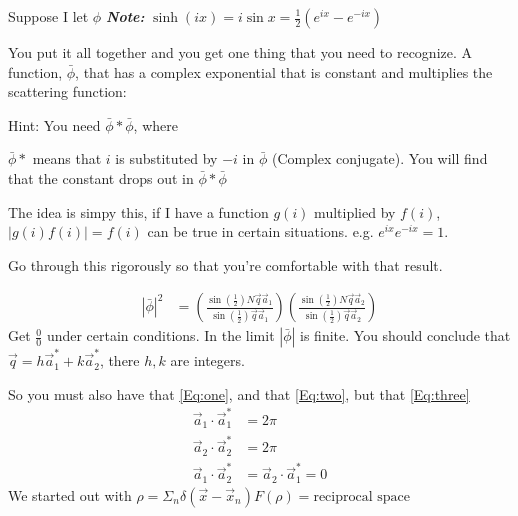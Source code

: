 \documentclass{article}
\newcommand{\qvec}[0]{\vec{q}}
\newcommand{\xvec}[0]{\vec{x}}
\newcommand{\aone}[0]{\vec{a}_1}
\newcommand{\atwo}[0]{\vec{a}_2}
\newcommand{\note}[1]{\vspace{3\parsep}\textit{\textbf{Note: }}#1\vspace{2\parsep}}
\newcommand{\norm}[1]{\left|#1\right|}
\begin{document}
\begin{section}{Suppose I let $\phi$}
	\note{$\sinh{(ix)}=i\sin{x}=\frac{1}{2}(e^{ix}-e^{-ix})$}

	You put it all together and you get one thing that you need to recognize. A function, $\bar{\phi}$, that has a complex exponential that is constant and multiplies the scattering function:

	Hint: You need $\bar{\phi}\ast\bar{\phi}$, where
	
	$\bar{\phi}\ast$ means that $i$ is substituted by $-i$ in $\bar{\phi}$ (Complex conjugate).
	You will find that the constant drops out in $\bar{\phi}\ast\bar{\phi}$ 
	
	The idea is simpy this, if I have a function $g(i)$ multiplied by $f(i)$, $\norm{g(i)f(i)} = f(i)$ can be true in certain situations. e.g. $e^{ix}e^{-ix}=1$.

	Go through this rigorously so that you're comfortable with that result.

	\begin{align*}
		\norm{\bar{\phi}}^2 &= \left(\frac{\sin{(\frac{1}{2})}N\qvec\aone}{\sin{(\frac{1}{2})}\qvec\aone}\right)\left(\frac{\sin{(\frac{1}{2})}N\qvec\atwo}{\sin{(\frac{1}{2})}\qvec\atwo}\right)
	\end{align*}
	Get $\frac{0}{0}$ under certain conditions. In the limit $\norm{\bar{\phi}}$ is finite. You should conclude that $\qvec = h\aone^\ast + k\atwo^\ast$, there $h,k$ are integers.

	So you must also have that \eqref{Eq:one}, and that \eqref{Eq:two}, but that \eqref{Eq:three}
	\begin{align}
		\aone\cdot\aone^\ast &= 2\pi\label{Eq:one}\\
		\atwo\cdot\atwo^\ast &= 2\pi\label{Eq:two}\\
		\aone\cdot\atwo^\ast &= \atwo\cdot\aone^\ast = 0\label{Eq:three}
	\end{align}
	We started out with $\rho = \Sigma_n \delta(\xvec-\xvec_n) F(\rho) = \text{reciprocal space}$


\end{section}
\end{document}
